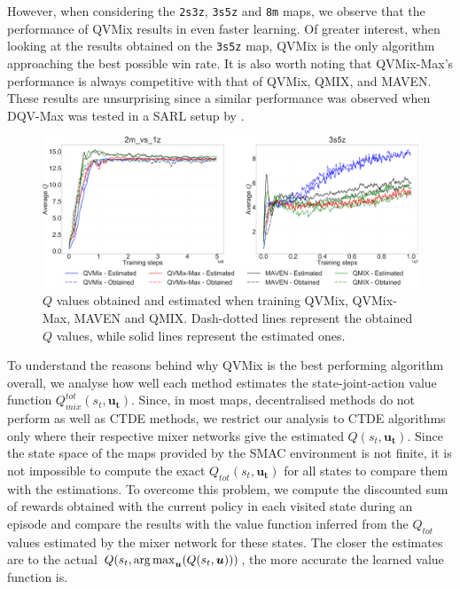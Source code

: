 However, when considering the \texttt{2s3z}, \texttt{3s5z} and \texttt{8m} maps, we observe that the performance of QVMix results in even faster learning. 
Of greater interest, when looking at the results obtained on the \texttt{3s5z} map, QVMix is the only algorithm approaching the best possible win rate.
It is also worth noting that QVMix-Max's performance is always competitive with that of QVMix, QMIX, and MAVEN.
These results are unsurprising since a similar performance was observed when DQV-Max was tested in a SARL setup by \cite{sabatelli2020deep}.

\begin{figure}
\centering
\includegraphics[width=.95\linewidth]{tex_thesis/figures/ch4/2m1z3s5zQ.pdf}
\caption{$Q$ values obtained and estimated when training QVMix, QVMix-Max, MAVEN and QMIX. Dash-dotted lines represent the obtained $Q$ values, while solid lines represent the estimated ones.}
\label{fig:exp_plots_overestim:q_best_worse}
\end{figure}

To understand the reasons behind why QVMix is the best performing algorithm overall, we analyse how well each method estimates the state-joint-action value function $Q_{mix}^{tot}(s_t, \mathbf{u_t})$. 
Since, in most maps, decentralised methods do not perform as well as CTDE methods, we restrict our analysis to CTDE algorithms only where their respective mixer networks give the estimated $Q(s_t, \mathbf{u_t})$.
Since the state space of the maps provided by the SMAC environment is not finite, it is not impossible to compute the exact $Q_{tot}(s_t, \mathbf{u_t})$ for all states to compare them with the estimations.
To overcome this problem, we compute the discounted sum of rewards obtained with the current policy in each visited state during an episode and compare the results with the value function inferred from the $Q_{tot}$ values estimated by the mixer network for these states.
The closer the estimates are to the actual $Q(s_t, \argmax_{\mathbf{u}}(Q(s_t,\mathbf{u})))$, the more accurate the learned value function is.

